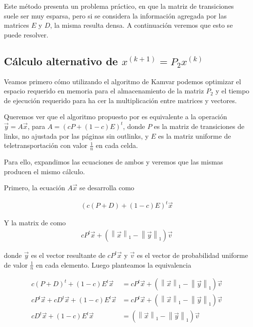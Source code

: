 Este método presenta un problema práctico, en que la matriz de transiciones suele ser muy
esparsa, pero si se considera la información agregada por las matrices $E$ y $D$, la misma
resulta densa. A continuación veremos que esto se puede resolver.

\subsection{Cálculo alternativo de $x^{(k + 1)} = P_2x^{(k)}$}

Veamos primero cómo utilizando el algoritmo de Kamvar podemos optimizar el espacio requerido
en memoria para el almacenamiento de la matriz $P_2$ y el tiempo de ejecución requerido para ha
cer la multiplicación entre matrices y vectores.

\newcommand{\vectornorm}[1]{\left\|#1\right\|}
Queremos ver que el algoritmo propuesto por \cite[Algoritmo 1]{Kamvar2003} es equivalente
a la operación $\vec{y} = A\vec{x}$, para $A=(cP + (1-c)E)^{t}$, donde $P$ es la matriz
de transiciones de links, no ajustada por las páginas sin outlinks,
y $E$ es la matriz uniforme de teletransportación con valor $\frac{1}{n}$ en cada celda.

Para ello, expandimos las ecuaciones de ambos y veremos que las mismas producen el mismo cálculo.

Primero, la ecuación $A\vec{x}$ se desarrolla como

\begin{align*}
(c(P + D) + (1 - c)E)^{t} \vec{x}
\end{align*}

Y la matrix de \cite[Algoritmo 1]{Kamvar2003} como
\begin{align*}
cP^{t}\vec{x} + (\vectornorm{\vec{x}}_1 - \vectornorm{\vec{y}}_1)\vec{v}
\end{align*}

donde $\vec{y}$ es el vector resultante de $cP^{t}\vec{x}$ y $\vec{v}$ es el vector de probabilidad
uniforme de valor $\frac{1}{n}$ en cada elemento. Luego planteamos la equivalencia

\begin{align*}
c(P + D)^{t} + (1-c)E^{t} \vec{x} &= cP^{t}\vec{x} + (\vectornorm{\vec{x}}_1 - \vectornorm{\vec{y}}_1)\vec{v} \\
cP^{t}\vec{x} + cD^{t}\vec{x} + (1-c)E^{t}\vec{x} &= cP^{t}\vec{x} + (\vectornorm{\vec{x}}_1 - \vectornorm{\vec{y}}_1)\vec{v} \\
cD^{t}\vec{x} + (1-c)E^{t}\vec{x} &= (\vectornorm{\vec{x}}_1 - \vectornorm{\vec{y}}_1)\vec{v}
\end{align*}


